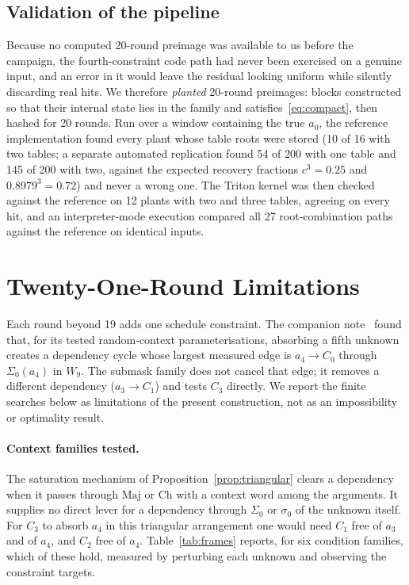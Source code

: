 \documentclass[11pt,a4paper]{article}
\newcommand{\Sig}[1]{\Sigma_{#1}}
\newcommand{\sig}[1]{\sigma_{#1}}
\newcommand{\Maj}{\mathrm{Maj}}
\newcommand{\Ch}{\mathrm{Ch}}
\begin{document}
\subsection{Validation of the pipeline}
\label{sec:validation}

Because no computed 20-round preimage was available to us before the
campaign, the fourth-constraint code path had never been exercised on a
genuine input, and an error in it
would leave the residual looking uniform while silently discarding real hits.
We therefore \emph{planted} 20-round preimages: blocks constructed so that
their internal state lies in the family and satisfies~\eqref{eq:compact}, then
hashed for 20 rounds.  Run over a window containing the true $a_0$, the
reference implementation found every plant whose table roots were stored (10
of 16 with two tables; a separate automated replication found 54 of 200 with one
table and 145 of 200 with two, against the expected recovery fractions
$c^3=0.25$ and $0.8979^3=0.72$) and never a wrong one.  The Triton kernel was
then checked against the reference on 12 plants with two and three tables,
agreeing on every hit, and an interpreter-mode execution compared all 27
root-combination paths against the reference on identical inputs.

\section{Twenty-One-Round Limitations}
\label{sec:barrier}

Each round beyond 19 adds one schedule constraint.  The companion
note~\cite{Basra2026R20} found that, for its tested random-context
parameterisations, absorbing a fifth unknown creates a dependency cycle whose
largest measured edge is $a_4\to C_0$ through $\Sig0(a_4)$ in $W_9$.  The
submask family does not cancel that edge; it removes a different dependency
($a_3\to C_1$) and tests $C_3$ directly.  We report the finite searches below
as limitations of the present construction, not as an impossibility or
optimality result.

\paragraph{Context families tested.}
The saturation mechanism of Proposition~\ref{prop:triangular} clears a
dependency when it passes through $\Maj$ or $\Ch$ with a context word among
the arguments.  It supplies no direct lever for a dependency through $\Sig0$
or $\sig0$ of the unknown itself.  For $C_3$ to absorb $a_4$ in this triangular
arrangement one would need $C_1$ free of
$a_3$ and of $a_4$, and $C_2$ free of $a_4$.  Table~\ref{tab:frames} reports,
for six condition families, which of these hold, measured by perturbing each
unknown and observing the constraint targets.
\end{document}
